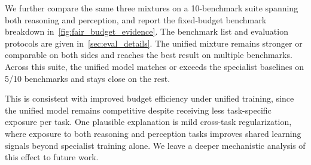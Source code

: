 We further compare the same three mixtures on a 10-benchmark suite spanning both reasoning and perception, and report the fixed-budget benchmark breakdown in~\cref{fig:fair_budget_evidence}.
%
The benchmark list and evaluation protocols are given in~\cref{sec:eval_details}.
%
The unified mixture remains stronger or comparable on both sides and reaches the best result on multiple benchmarks.
%
Across this suite, the unified model matches or exceeds the specialist baselines on 5/10 benchmarks and stays close on the rest.

This is consistent with improved budget efficiency under unified training, since the unified model remains competitive despite receiving less task-specific exposure per task.
%
One plausible explanation is mild cross-task regularization, where exposure to both reasoning and
perception tasks improves shared learning signals beyond specialist training alone.
%
We leave a deeper mechanistic analysis of this effect to future work.


